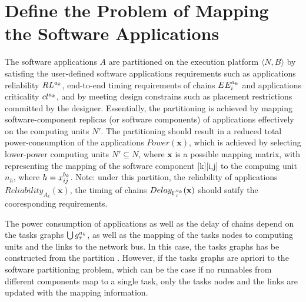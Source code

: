\section{Define the Problem of Mapping the Software Applications}\label{sec_problem}
The software applications $A$ are partitioned on the execution platform $\langle N,B\rangle$ by satisfing the user-defined software applications requirements such as applications reliability $\ssp{RL}$, end-to-end timing requirements of chains $\sss{EE}$ and applications criticality $\ssp{cl}$, and by meeting design constrains such as placement restrictions committed by the designer. Essentially, the partitioning is achieved by mapping software-component replicas (or software components) of applications effectively on the computing units $N'$. The partitioning should result in a reduced total power-consumption of the applications $Power(\textbf{x})$, which is achieved by selecting lower-power computing units $N'\subseteq N$, where $\textbf{x}$ is a possible mapping matrix, with \ttxkij representing the mapping of the software component [k][i,j] to the compuing unit $n_h$, where $h=x^{b_k}_{ij}$.  Note: under this partition, the reliability of applications $Reliability_{A_k}(\textbf{x})$, the timing of chains $Delay_{\sss{\Gamma}}(\textbf{x})$ should satify the cooresponding requirements. 

The power consumption of applications as well as the delay of chains depend on the tasks graphs $\bigcup\sss{g}[k][\tau]$, as well as the mapping of the tasks nodes to computing units and the links to the network bus. In this case, the tasks graphs has be constructed from the partition \ttx. However, if the tasks graphs are apriori to the software partitioning problem,  which can be the case if no runnables from different components map to a single task, only the tasks nodes and the links are updated with the mapping information.

